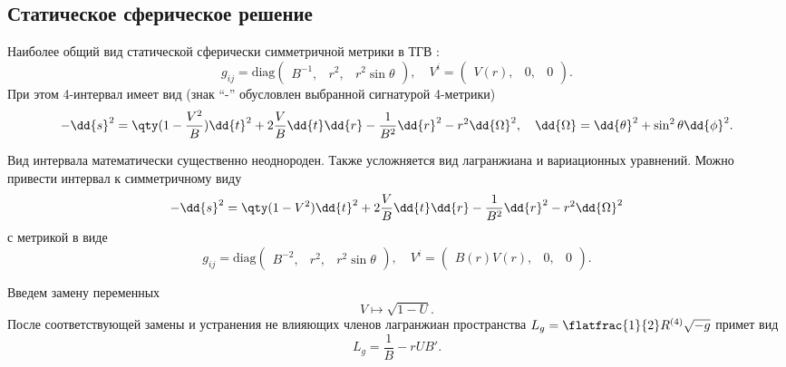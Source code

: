 \documentclass[\docroot/reports/draft/report.tex]{subfiles}
\begin{document}
\onlyinsubfile{\tableofcontents}

\subsection{Статическое сферическое решение}

    Наиболее общий вид статической сферически симметричной метрики в ТГВ \cite{burlankov_space_dynamics,burlankov_new_phys}:
    \begin{equation*}
        g_{ij} = \text{diag} \begin{pmatrix}B^{-1}, & r^2, & r^2 \sin\theta\end{pmatrix} , \quad
        V^i = \begin{pmatrix}V(r), & 0, & 0\end{pmatrix} .
    \end{equation*}
    При этом 4-интервал имеет вид (знак \enquote{-} обусловлен выбранной сигнатурой 4-метрики)
    \begin{equation*}
        - \dd{s}^2 = \qty(1 - \frac{V^2}{B}) \dd{t}^2 + 2 \frac{V}{B} \dd{t} \dd{r} - \frac{1}{B^2} \dd{r}^2 - r^2 \dd{\Omega}^2 , \quad \dd{\Omega} = \dd{\theta}^2 + \sin^2{\theta} \dd{\phi}^2 .
    \end{equation*}

    Вид интервала математически существенно неоднороден. Также усложняется вид лагранжиана и вариационных уравнений. Можно привести интервал к симметричному виду
    \begin{equation*}
        - \dd{s}^2 = \qty(1 - V^2) \dd{t}^2 + 2 \frac{V}{B} \dd{t} \dd{r} - \frac{1}{B^2} \dd{r}^2 - r^2 \dd{\Omega}^2
    \end{equation*}
    с метрикой в виде
    \begin{equation*}
        g_{ij} = \text{diag} \begin{pmatrix}B^{-2}, & r^2, & r^2 \sin\theta\end{pmatrix} , \quad
        V^i = \begin{pmatrix}B(r)V(r), & 0, & 0\end{pmatrix} .
    \end{equation*}

    Введем замену переменных
    \begin{equation*}
        V \mapsto \sqrt{1 - U} .
    \end{equation*}
    После соответствующей замены и устранения не влияющих членов лагранжиан пространства $L_g = \flatfrac{1}{2} R^{(4)} \sqrt{-g}$ примет вид
    \begin{equation*}
        L_g = \frac{1}{B} - r U B' .
    \end{equation*}
\end{document}
